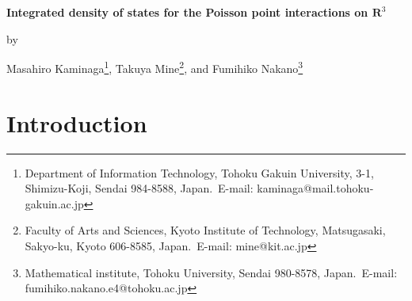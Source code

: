 \documentclass[12pt,a4paper]{article}
\begin{document}
\begin{center}
 {\large\bf 
Integrated density of states for the Poisson point interactions
on $\mathbf{R}^3$
}

by

Masahiro Kaminaga\footnote{
Department of Information Technology,
Tohoku Gakuin University,
3-1, Shimizu-Koji, Sendai 984-8588, Japan.\ 
E-mail: kaminaga@mail.tohoku-gakuin.ac.jp
}, %
Takuya Mine\footnote{
Faculty of Arts and Sciences,
Kyoto Institute of Technology,
Matsugasaki, Sakyo-ku,
Kyoto 606-8585, Japan.\ 
E-mail: mine@kit.ac.jp
}, %
and Fumihiko Nakano\footnote{
Mathematical institute,
Tohoku University,
Sendai 980-8578, Japan.\ 
E-mail: fumihiko.nakano.e4@tohoku.ac.jp
}
\end{center}

\begin{abstract}
We determine the principal term of
the asymptotics of the integrated density of states (IDS) 
$N(\lambda)$
for the 
Schr\"odinger operator with point interactions on $\mathbf{R}^3$
as $\lambda \to -\infty$,
provided that 
the set of positions of the point obstacles is the Poisson configuration,
and the interaction parameters are bounded i.i.d.\ random variables.
In particular, we prove $N(\lambda) =O(|\lambda|^{-3/2})$ as $\lambda\to -\infty$.
In the case that all interaction parameters are equal to a constant, 
we give a more detailed asymptotics
of $N(\lambda)$,
and verify the result by a numerical method using 
the R programming language.
As a byproduct, we give a rigorous definition of
the Schr\"odinger operators with point interactions 
on a bounded open set with the Dirichlet or Neumann 
boundary conditions by the method of quadratic form, 
and study fundamental properties
about the counting functions of eigenvalues; 
e.g., Dirichlet--Neumann bracketing, etc.
\end{abstract}

\section{Introduction}
\end{document}
